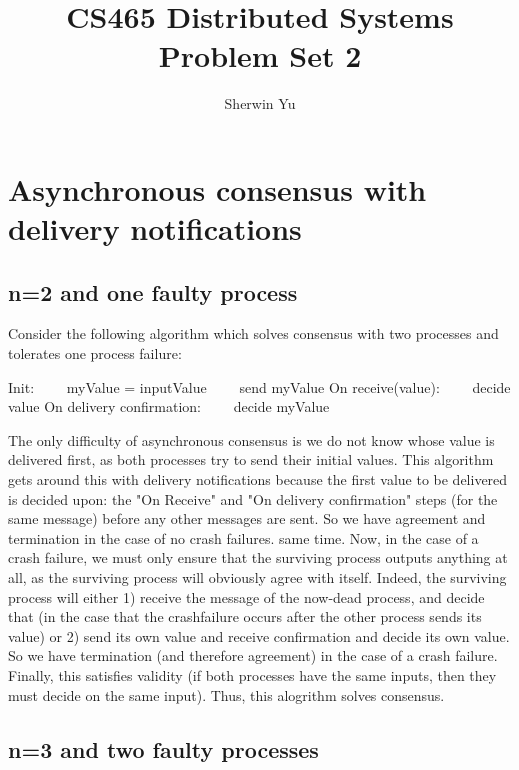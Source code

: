 \documentclass{article}
\begin{document}
\title{CS465 Distributed Systems Problem Set 2}
\author{Sherwin Yu}
\maketitle


\section{Asynchronous consensus with delivery notifications}
\label{problem1.1}
\subsection{n=2 and one faulty process}
Consider the following algorithm which solves consensus with two processes and tolerates one process failure:

\begin{algorithmic}
\STATE Init:
\STATE \ \ \ \ myValue = inputValue
\STATE \ \ \ \ send  myValue
\STATE On receive(value):
\STATE \ \ \ \ decide value
\STATE On delivery confirmation:
\STATE \ \ \ \ decide myValue
\end{algorithmic}

  The only difficulty of asynchronous consensus is we do not know whose value is delivered first, as both processes try to send their initial values. This algorithm gets around
this with delivery notifications because the first value to be delivered is decided upon: the "On Receive" and "On delivery confirmation" steps (for the same message) before any
other messages are sent. So we have agreement and termination in the case of no crash failures.
same time. 
  Now, in the case of a crash failure, we must only ensure that the surviving process outputs anything at all, as the surviving process will obviously agree with itself. Indeed,
the surviving process will either 1) receive the message of the now-dead process, and decide that (in the case that the crashfailure occurs after the other process sends its value) or 2) send its
own value and receive confirmation and decide its own value. So we have termination (and therefore agreement)  in the case of a crash failure.
  Finally, this satisfies validity (if both processes have the same inputs, then they must decide on the same input). Thus, this alogrithm solves consensus.

  \subsection{n=3 and two faulty processes}
\end{document}
